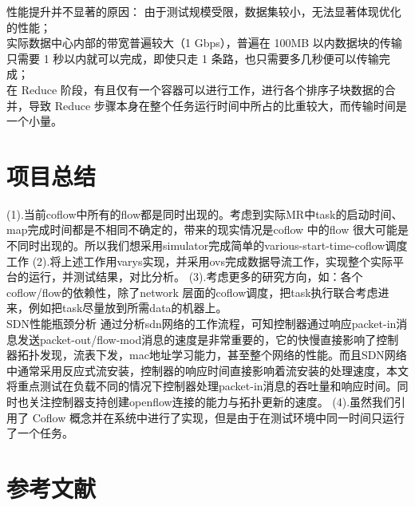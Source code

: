 \documentclass[a4paper, 11pt]{article}                                                   %
\begin{document}
\begin{CJK*}{UTF8}{song}
性能提升并不显著的原因：
由于测试规模受限，数据集较小，无法显著体现优化的性能；\\
实际数据中心内部的带宽普遍较大（1 Gbps），普遍在 100MB 以内数据块的传输只需要 1 秒以内就可以完成，即使只走 1 条路，也只需要多几秒便可以传输完成；\\
在 Reduce 阶段，有且仅有一个容器可以进行工作，进行各个排序子块数据的合并，导致 Reduce 步骤本身在整个任务运行时间中所占的比重较大，而传输时间是一个小量。

\section{项目总结}
(1).当前coflow中所有的flow都是同时出现的。考虑到实际MR中task的启动时间、map完成时间都是不相同不确定的，带来的现实情况是coflow 中的flow 很大可能是不同时出现的。所以我们想采用simulator完成简单的various-start-time-coflow调度工作
(2).将上述工作用varys实现，并采用ovs完成数据导流工作，实现整个实际平台的运行，并测试结果，对比分析。
(3).考虑更多的研究方向，如：各个coflow/flow的依赖性，除了network 层面的coflow调度，把task执行联合考虑进来，例如把task尽量放到所需data的机器上。\\
SDN性能瓶颈分析
通过分析sdn网络的工作流程，可知控制器通过响应packet-in消息发送packet-out/flow-mod消息的速度是非常重要的，它的快慢直接影响了控制器拓扑发现，流表下发，mac地址学习能力，甚至整个网络的性能。而且SDN网络中通常采用反应式流安装，控制器的响应时间直接影响着流安装的处理速度，本文将重点测试在负载不同的情况下控制器处理packet-in消息的吞吐量和响应时间。同时也关注控制器支持创建openflow连接的能力与拓扑更新的速度。
(4).虽然我们引用了 Coflow 概念并在系统中进行了实现，但是由于在测试环境中同一时间只运行了一个任务。

\section{参考文献}





\end{CJK*}
\end{document}
